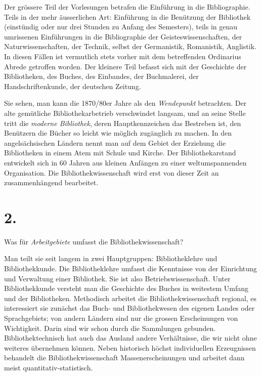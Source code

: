 \documentclass[a4paper,
fontsize=11pt,
oneside,
numbers=noperiodatend,
parskip=half-,
bibliography=totoc,
final
]{scrartcl}
\begin{document}
Der grössere Teil der Vorlesungen betrafen die Einführung in die
Bibliographie. Teils in der mehr äusserlichen Art: Einführung in die
Benützung der Bibliothek (einstündig oder nur drei Stunden zu Anfang des
Semesters), teils in genau umrissenen Einführungen in die Bibliographie
der Geisteswissenschaften, der Naturwissenschaften, der Technik, selbst
der Germanistik, Romanistik, Anglistik. In diesen Fällen ist vermutlich
stets vorher mit dem betreffenden Ordinarius Abrede getroffen worden.
Der kleinere Teil befasst sich mit der Geschichte der Bibliotheken, des
Buches, des Einbandes, der Buchmalerei, der Handschriftenkunde, der
deutschen Zeitung.

Sie sehen, man kann die 1870/80er Jahre als den \emph{Wendepunkt}
betrachten. Der alte gemütliche Bibliothekarbetrieb verschwindet
langsam, und an seine Stelle tritt die \emph{moderne Bibliothek}, deren
Hauptkennzeichen das Bestreben ist, den Benützern die Bücher so leicht
wie möglich zugänglich zu machen. In den angelsächsischen Ländern nennt
man auf dem Gebiet der Erziehung die Bibliotheken in einem Atem mit
Schule und Kirche. Der Bibliothekarstand entwickelt sich in 60 Jahren
aus kleinen Anfängen zu einer weltumspannenden Organisation. Die
Bibliothekwissenschaft wird erst von dieser Zeit an zusammenhängend
bearbeitet.

\hypertarget{section-1}{%
\section{2.}\label{section-1}}

Was für \emph{Arbeitgebiete} umfasst die Bibliothekwissenschaft?

Man teilt sie seit langem in zwei Hauptgruppen: Bibliotheklehre und
Bibliothekkunde. Die Bibliotheklehre umfasst die Kenntnisse von der
Einrichtung und Verwaltung einer Bibliothek. Sie ist also
Betriebswissenschaft. Unter Bibliothekkunde versteht man die Geschichte
des Buches in weitestem Umfang und der Bibliotheken. Methodisch arbeitet
die Bibliothekwissenschaft regional, es interessiert sie zunächst das
Buch- und Bibliothekwesen des eigenen Landes oder Sprachgebiets; von
andern Ländern sind nur die grossen Erscheinungen von Wichtigkeit. Darin
sind wir schon durch die Sammlungen gebunden. Bibliothektechnisch hat
auch das Ausland andere Verhältnisse, die wir nicht ohne weiteres
übernehmen können. Neben historisch höchst individuellen Erzeugnissen
behandelt die Bibliothekwissenschaft Massenerscheinungen und arbeitet
dann meist quantitativ-statistisch.
\end{document}

